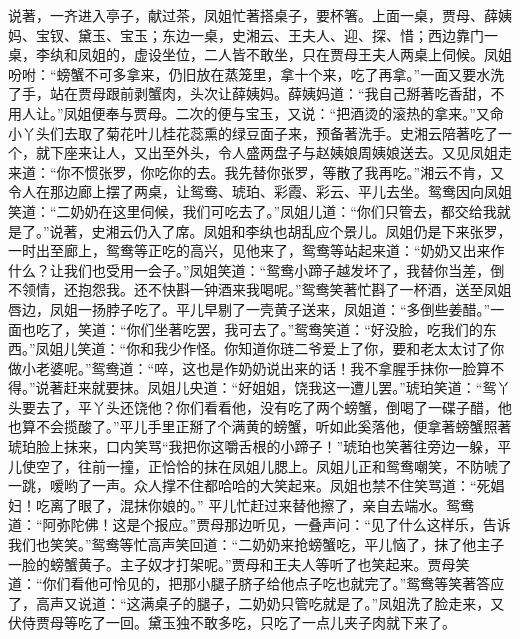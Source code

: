 \begin{parag}


    说著，一齐进入亭子，献过茶，凤姐忙著搭桌子，要杯箸。上面一桌，贾母、薛姨妈、宝钗、黛玉、宝玉；东边一桌，史湘云、王夫人、迎、探、惜；西边靠门一桌，李纨和凤姐的，虚设坐位，二人皆不敢坐，只在贾母王夫人两桌上伺候。凤姐吩咐：“螃蟹不可多拿来，仍旧放在蒸笼里，拿十个来，吃了再拿。”一面又要水洗了手，站在贾母跟前剥蟹肉，头次让薛姨妈。薛姨妈道：“我自己掰著吃香甜，不用人让。”凤姐便奉与贾母。二次的便与宝玉，又说：“把酒烫的滚热的拿来。”又命小丫头们去取了菊花叶儿桂花蕊熏的绿豆面子来，预备著洗手。史湘云陪著吃了一个，就下座来让人，又出至外头，令人盛两盘子与赵姨娘周姨娘送去。又见凤姐走来道：“你不惯张罗，你吃你的去。我先替你张罗，等散了我再吃。”湘云不肯，又令人在那边廊上摆了两桌，让鸳鸯、琥珀、彩霞、彩云、平儿去坐。鸳鸯因向凤姐笑道：“二奶奶在这里伺候，我们可吃去了。”凤姐儿道：“你们只管去，都交给我就是了。”说著，史湘云仍入了席。凤姐和李纨也胡乱应个景儿。凤姐仍是下来张罗，一时出至廊上，鸳鸯等正吃的高兴，见他来了，鸳鸯等站起来道：“奶奶又出来作什么？让我们也受用一会子。”凤姐笑道：“鸳鸯小蹄子越发坏了，我替你当差，倒不领情，还抱怨我。还不快斟一钟酒来我喝呢。”鸳鸯笑著忙斟了一杯酒，送至凤姐唇边，凤姐一扬脖子吃了。平儿早剔了一壳黄子送来，凤姐道：“多倒些姜醋。”一面也吃了，笑道：“你们坐著吃罢，我可去了。”鸳鸯笑道：“好没脸，吃我们的东西。”凤姐儿笑道：“你和我少作怪。你知道你琏二爷爱上了你，要和老太太讨了你做小老婆呢。”鸳鸯道：“啐，这也是作奶奶说出来的话！我不拿腥手抹你一脸算不得。”说著赶来就要抹。凤姐儿央道：“好姐姐，饶我这一遭儿罢。”琥珀笑道：“鸳丫头要去了，平丫头还饶他？你们看看他，没有吃了两个螃蟹，倒喝了一碟子醋，他也算不会揽酸了。”平儿手里正掰了个满黄的螃蟹，听如此奚落他，便拿著螃蟹照著琥珀脸上抹来，口内笑骂“我把你这嚼舌根的小蹄子！”琥珀也笑著往旁边一躲，平儿使空了，往前一撞，正恰恰的抹在凤姐儿腮上。凤姐儿正和鸳鸯嘲笑，不防唬了一跳，嗳哟了一声。众人撑不住都哈哈的大笑起来。凤姐也禁不住笑骂道：“死娼妇！吃离了眼了，混抹你娘的。” 平儿忙赶过来替他擦了，亲自去端水。鸳鸯道：“阿弥陀佛！这是个报应。”贾母那边听见，一叠声问：“见了什么这样乐，告诉我们也笑笑。”鸳鸯等忙高声笑回道：“二奶奶来抢螃蟹吃，平儿恼了，抹了他主子一脸的螃蟹黄子。主子奴才打架呢。”贾母和王夫人等听了也笑起来。贾母笑道：“你们看他可怜见的，把那小腿子脐子给他点子吃也就完了。”鸳鸯等笑著答应了，高声又说道：“这满桌子的腿子，二奶奶只管吃就是了。”凤姐洗了脸走来，又伏侍贾母等吃了一回。黛玉独不敢多吃，只吃了一点儿夹子肉就下来了。
\end{parag}


